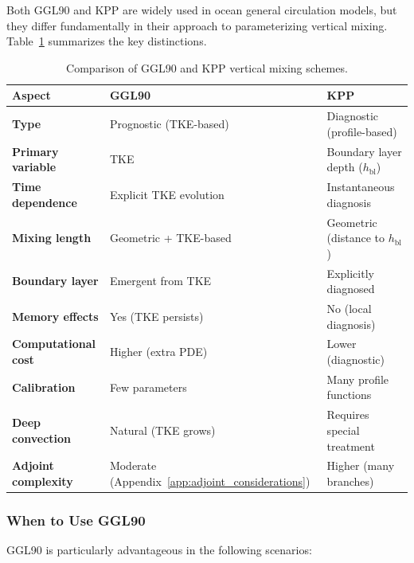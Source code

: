 \documentclass[12pt,letterpaper]{article}
\begin{document}
Both GGL90 and KPP are widely used in ocean general circulation models, but
they differ fundamentally in their approach to parameterizing vertical mixing.
Table~\ref{tab:ggl90_vs_kpp} summarizes the key distinctions.

\begin{table}[h!]
\centering
\caption{Comparison of GGL90 and KPP vertical mixing schemes.}
\label{tab:ggl90_vs_kpp}
\begin{tabular}{@{}lll@{}}
\toprule
\textbf{Aspect} & \textbf{GGL90} & \textbf{KPP} \\
\midrule
\textbf{Type} & Prognostic (TKE-based) & Diagnostic (profile-based) \\
\textbf{Primary variable} & TKE & Boundary layer depth ($h_{\mathrm{bl}}$) \\
\textbf{Time dependence} & Explicit TKE evolution & Instantaneous diagnosis \\
\textbf{Mixing length} & Geometric + TKE-based & Geometric (distance to $h_{\mathrm{bl}}$) \\
\textbf{Boundary layer} & Emergent from TKE & Explicitly diagnosed \\
\textbf{Memory effects} & Yes (TKE persists) & No (local diagnosis) \\
\textbf{Computational cost} & Higher (extra PDE) & Lower (diagnostic) \\
\textbf{Calibration} & Few parameters & Many profile functions \\
\textbf{Deep convection} & Natural (TKE grows) & Requires special treatment \\
\textbf{Adjoint complexity} & Moderate (Appendix~\ref{app:adjoint_considerations}) & Higher (many branches) \\
\bottomrule
\end{tabular}
\end{table}

\subsubsection{When to Use GGL90}

GGL90 is particularly advantageous in the following scenarios:
\end{document}
